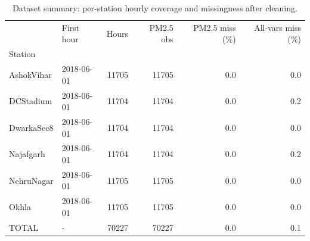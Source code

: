 \begin{table}
\caption{Dataset summary: per-station hourly coverage and missingness after cleaning.}
\label{tab:dataset}
\begin{tabular}{llrrrr}
\toprule
 & First hour & Hours & PM2.5 obs & PM2.5 miss (\%) & All-vars miss (\%) \\
Station &  &  &  &  &  \\
\midrule
AshokVihar & 2018-06-01 & 11705 & 11705 & 0.0 & 0.0 \\
DCStadium & 2018-06-01 & 11704 & 11704 & 0.0 & 0.2 \\
DwarkaSec8 & 2018-06-01 & 11704 & 11704 & 0.0 & 0.0 \\
Najafgarh & 2018-06-01 & 11704 & 11704 & 0.0 & 0.2 \\
NehruNagar & 2018-06-01 & 11705 & 11705 & 0.0 & 0.0 \\
Okhla & 2018-06-01 & 11705 & 11705 & 0.0 & 0.0 \\
TOTAL & - & 70227 & 70227 & 0.0 & 0.1 \\
\bottomrule
\end{tabular}
\end{table}
